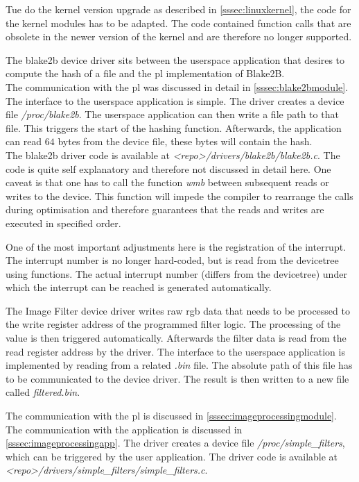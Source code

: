 Tue do the kernel version upgrade as described in \cref{sssec:linuxkernel}, the code for the kernel modules has to be adapted. The code contained function calls that are obsolete in the newer version of the kernel and are therefore no longer supported.

The blake2b device driver sits between the userspace application that desires to
compute the hash of a file and the \gls{pl} implementation of Blake2B.\\
The communication with the \gls{pl} was discussed in detail in
\cref{sssec:blake2bmodule}.\\
The interface to the userspace application is simple.
The driver creates a device file \emph{/proc/blake2b}.
The userspace application can then write a file path to that file.
This triggers the start of the hashing function.
Afterwards, the application can read $64$ bytes from the device file, these
bytes will contain the hash.\\
The blake2b driver code is available at \emph{<repo>/drivers/blake2b/blake2b.c}.
The code is quite self explanatory and therefore not discussed in detail here.
One caveat is that one has to call the function \emph{wmb} between subsequent
reads or writes to the device.
This function will impede the compiler to rearrange the calls during
optimisation and therefore guarantees that the reads and writes are executed in
specified order.

One of the most important adjustments here is the registration of the interrupt. The interrupt number is no longer hard-coded, but is read from the devicetree using functions. The actual interrupt number (differs from the devicetree) under which the interrupt can be reached is generated automatically.

The Image Filter device driver writes raw \gls{rgb} data that needs to be
processed to the write register address of the programmed filter logic.
The processing of the value is then triggered automatically.
Afterwards the filter data is read from the read register address by the driver.
The interface to the userspace application is implemented by reading from a related \emph{.bin} file. The absolute path of this file has to be communicated to the device driver. The result is then written to a new file called \emph{filtered.bin}.

The communication with the \gls{pl} is discussed in \cref{sssec:imageprocessingmodule}.
The communication with the application is discussed in \cref{sssec:imageprocessingapp}.
The driver creates a device file \emph{/proc/simple\_filters}, which can be triggered by the user application.
The driver code is available at \emph{<repo>/drivers/simple\_filters/simple\_filters.c}.
